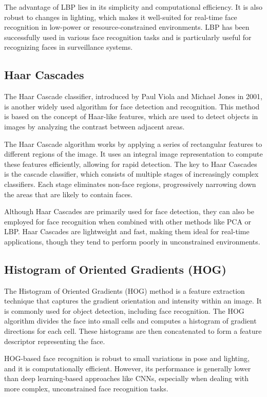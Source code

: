 The advantage of LBP lies in its simplicity and computational efficiency. It is also robust to changes in lighting, which makes it well-suited for real-time face recognition in low-power or resource-constrained environments. LBP has been successfully used in various face recognition tasks and is particularly useful for recognizing faces in surveillance systems.

\subsection{Haar Cascades}
The Haar Cascade classifier, introduced by Paul Viola and Michael Jones in 2001, is another widely used algorithm for face detection and recognition. This method is based on the concept of Haar-like features, which are used to detect objects in images by analyzing the contrast between adjacent areas.

The Haar Cascade algorithm works by applying a series of rectangular features to different regions of the image. It uses an integral image representation to compute these features efficiently, allowing for rapid detection. The key to Haar Cascades is the cascade classifier, which consists of multiple stages of increasingly complex classifiers. Each stage eliminates non-face regions, progressively narrowing down the areas that are likely to contain faces.

Although Haar Cascades are primarily used for face detection, they can also be employed for face recognition when combined with other methods like PCA or LBP. Haar Cascades are lightweight and fast, making them ideal for real-time applications, though they tend to perform poorly in unconstrained environments.

\subsection{Histogram of Oriented Gradients (HOG)}
The Histogram of Oriented Gradients (HOG) method is a feature extraction technique that captures the gradient orientation and intensity within an image. It is commonly used for object detection, including face recognition. The HOG algorithm divides the face into small cells and computes a histogram of gradient directions for each cell. These histograms are then concatenated to form a feature descriptor representing the face.

HOG-based face recognition is robust to small variations in pose and lighting, and it is computationally efficient. However, its performance is generally lower than deep learning-based approaches like CNNs, especially when dealing with more complex, unconstrained face recognition tasks.

